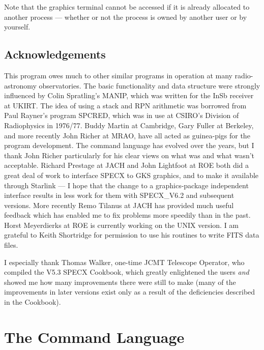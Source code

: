 \documentclass[11pt,twoside]{report}
\begin{document}
Note that the graphics terminal cannot be accessed if it is already allocated
to another process --- whether or not the process is owned by another user
or by yourself.

\section{Acknowledgements}

This program owes much to other similar programs in operation at many
radio-astronomy observatories. The basic functionality and data structure were
strongly influenced by Colin Spratling's
MANIP, which was written for the InSb
receiver at UKIRT. The idea of using a stack and RPN
arithmetic was borrowed from Paul Rayner's program SPCRED, which was in use at CSIRO's
Division of Radiophysics in 1976/77. Buddy Martin at
Cambridge, Gary Fuller at Berkeley, and more recently John
Richer at MRAO, have all  acted as guinea-pigs for the
program development. The command language has evolved over the years, but I
thank John Richer particularly for his clear views on what was and what wasn't
acceptable. Richard Prestage at JACH and John
Lightfoot at ROE both did a great deal of work to interface SPECX to GKS
graphics, and to make it available through
Starlink --- I hope that the change to a graphics-package
independent interface results in less work for them with SPECX\_V6.2 and
subsequent versions. More recently Remo Tilanus at JACH has provided much
useful feedback which has enabled me to fix problems more speedily than in the
past. Horst Meyerdierks at ROE is currently working on the UNIX version. I am
grateful to Keith Shortridge for permission to use his routines to write FITS
data files.

I especially thank Thomas Walker, one-time JCMT Telescope
Operator, who compiled the V5.3 SPECX Cookbook, which
greatly enlightened the users {\em and} showed me how many improvements there
were still to make (many of the improvements in later versions exist only as a
result of the deficiencies described in the Cookbook).

\chapter{The Command Language}
\end{document}
